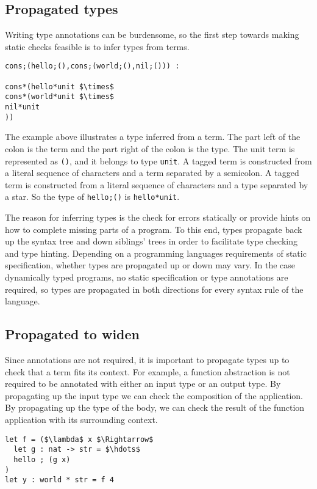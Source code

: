 \documentclass[manuscript]{acmart}
\theoremstyle{definition}
\begin{document}
\subsection{Propagated types}
Writing type annotations can be burdensome, so the first step 
towards making static checks feasible is to infer types from terms.

\begin{lstlisting}
cons;(hello;(),cons;(world;(),nil;())) : 

cons*(hello*unit $\times$ 
cons*(world*unit $\times$ 
nil*unit
))
\end{lstlisting}

\noindent The example above illustrates a type inferred from a term.
The part left of the colon is the term and the part right of the colon is the type.
The unit term is represented as \lstinline{()}, and it belongs to type \lstinline{unit}. 
A tagged term is constructed from a literal sequence of characters and a term separated
by a semicolon. A tagged term is constructed from a literal sequence of characters
and a type separated by a star.
So the type of \lstinline{hello;()} is \lstinline{hello*unit}.

The reason for inferring types is the check for errors statically or 
provide hints on how to complete missing parts of a program. To this end,
types propagate back up the syntax tree and down siblings' trees in order
to facilitate type checking and type hinting.
Depending on a programming languages requirements of static specification, 
whether types are propagated up or down may vary. 
In the case dynamically typed programs, no static specification or type annotations
are required, so types are propagated in both directions for every syntax rule
of the language.


\subsection{Propagated to widen}
Since annotations are not required, it is important to propagate types up to check
that a term fits its context.
For example, a function abstraction is not required to be annotated 
with either an input type or an output type. 
\noindent By propagating up the input type we can check the composition of the application.
By propagating up the type of the body, we can check the result of the function application 
with its surrounding context. 

\begin{lstlisting}
let f = ($\lambda$ x $\Rightarrow$ 
  let g : nat -> str = $\hdots$
  hello ; (g x)
) 
let y : world * str = f 4
\end{lstlisting}
\end{document}

